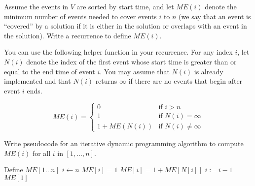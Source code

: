 \begin{questions}
	\question[4] Assume the events in $V$ are sorted by start time, and let $ME(i)$ denote the minimum number of events needed to cover events $i$ to $n$ (we say that an event is ``covered'' by a solution if it is either in the solution or overlaps with an event in the solution). Write a recurrence to define $ME(i)$.

	You can use the following helper function in your recurrence. For any index $i$, let $N(i)$ denote the index of the first event whose start time is greater than or equal to the end time of event $i$. You may assume that $N(i)$ is already implemented and that $N(i)$ returns $\infty$ if there are no events that begin after event $i$ ends.

	\ifsolutions\fi


	\begin{soln}

		\[
			ME(i) = \begin{cases}
				0            & \text{if } i > n            \\
				1            & \text{if } N(i) = \infty    \\
				1 + ME(N(i)) & \text{if } N(i) \neq \infty
			\end{cases}
		\]


	\end{soln}

	\question[4] Write pseudocode for an iterative dynamic programming algorithm to compute $ME(i)$ for all $i$ in $[1, \ldots, n]$.
	\ifsolutions\fi
	\begin{soln}
		\begin{algorithmic}[1]
			\State Define $ME[1 \dots n]$
			\State $i \gets n$
			\State $ME[i] = 1$
			\Else
			\State $ME[i] = 1 + ME[N[i]]$
			\EndIf
			\State $i := i - 1$
			\EndWhile
			\State \Return $ME[1]$
			\EndProcedure
		\end{algorithmic}
	\end{soln}


\end{questions}
